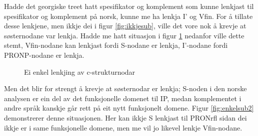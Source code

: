 \documentclass[11pt,a4paper,oneside,draft]{book}
\begin{document}
Hadde det georgiske treet hatt spesifikator og komplement som kunne
lenkjast til spesifikator og komplement på norsk, kunne me ha lenkja
I' og Vfin. For å tillate desse lenkjene, men ikkje dei i figur
\ref{fig:ikkjesub}, ville det vore nok å krevje at søsternodane var
lenkja. Hadde me hatt situasjon i figur \ref{fig:enkelsub} nedanfor
ville dette stemt, Vfin-nodane kan lenkjast fordi S-nodane er lenkja,
I'-nodane fordi PRONP-nodane er lenkja. 

    \begin{figure}[htp]
    \centering
    
    
    \caption{Ei enkel lenkjing av c-strukturnodar}
     \label{fig:enkelsub}
    \end{figure}


Men det blir for strengt å krevje at søsternodar er lenkja; S-noden i
den norske analysen er ein del av det funksjonelle domenet til IP,
medan komplementet i andre språk kanskje går rett på eit nytt
funksjonelt domene. Figur \ref{fig:enkelsub2} demonstrerer denne
situasjonen. Her kan ikkje S lenkjast til PRONrfl sidan dei ikkje er i
same funksjonelle domene, men me vil jo likevel lenkje Vfin-nodane. 
\end{document}
